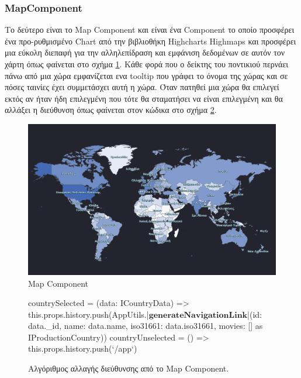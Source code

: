 \subsubsection{MapComponent}
Το δεύτερο είναι το Map Component και είναι ένα Component το οποίο προσφέρει ένα προ-ρυθμισμένο Chart από την βιβλιοθήκη Highcharts Highmaps και προσφέρει μια εύκολη διεπαφή για την αλληλεπίδραση και εμφάνιση δεδομένων σε αυτόν τον χάρτη όπως φαίνεται στο σχήμα \ref{layout:mapcomponent}. Κάθε φορά που ο δείκτης του ποντικιού περνάει πάνω από μια χώρα εμφανίζεται ενα tooltip που γράφει το όνομα της χώρας και σε πόσες ταινίες έχει συμμετάσχει αυτή η χώρα. Όταν πατηθεί μια χώρα θα επιλεγεί εκτός αν ήταν ήδη επιλεγμένη που τότε θα σταματήσει να είναι επιλεγμένη και θα αλλάξει η διεύθυνση όπως φαίνεται στον κώδικα στο σχήμα \ref{code:map_urlchanger}.
\begin{figure}[H]
  \centering
  \includegraphics[width=140mm]{Chapters/5 - Architecture/Client/Images/world_map.PNG}
  \caption{Map Component}
  \label{layout:mapcomponent}
\end{figure}

\begin{figure}[H]
    \begin{TypeScriptcode}
countrySelected = (data: ICountryData) => {
  this.props.history.push(AppUtils.|$\textbf{generateNavigationLink}$|({id: data._id, name: data.name, iso31661: data.iso31661, movies: []} as IProductionCountry))
}
countryUnselected = () => {
  this.props.history.push(`/app`)
}
    \end{TypeScriptcode}
    \caption{Αλγόριθμος αλλαγής διεύθυνσης από το Map Component.}
   \label{code:map_urlchanger}
\end{figure}
